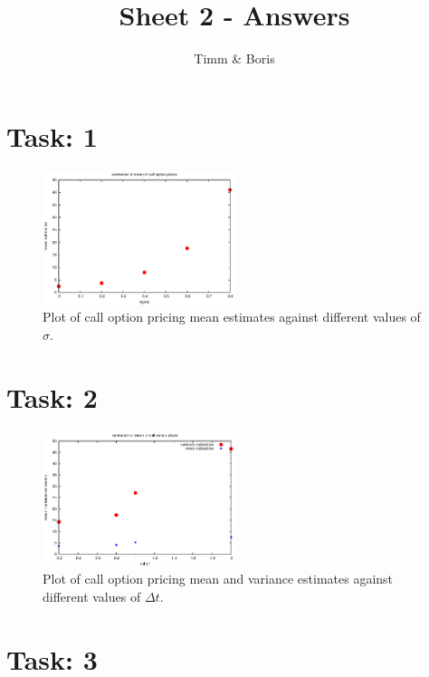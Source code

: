 \documentclass{article}
\title{Sheet 2 - Answers}
\author{Timm \& Boris}
\begin{document}
\maketitle

\section*{Task: 1}

\begin{figure}[htbp]
  \centering
    \includegraphics[width=0.50\textwidth]{../Task01/sh2_task1_mean_estimates_plot.eps}
  \caption{Plot of call option pricing mean estimates against different values of $\sigma$.}
\end{figure}

\section*{Task: 2}

\begin{figure}[htbp]
  \centering
    \includegraphics[width=0.50\textwidth]{../Task02/sh2_task2_variance_estimates_plot.eps}
  \caption{Plot of call option pricing mean and variance estimates against different values of $\Delta t$.}
\end{figure}

\section*{Task: 3}
\end{document}
